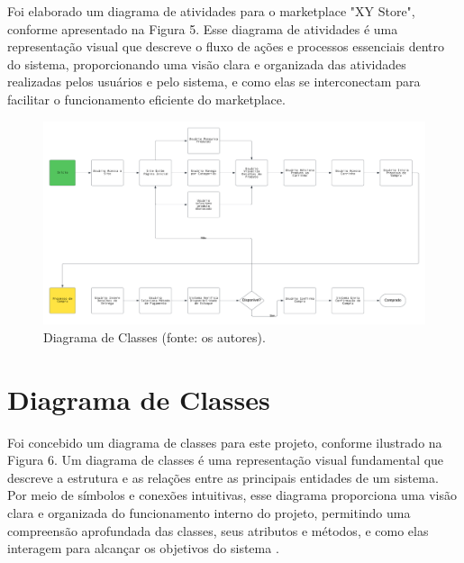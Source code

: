 \documentclass[
	12pt,				%
	openright,			%
	twoside,			%
	a4paper,			%
	english,			%
	brazil				%
	]{abntex2}
\begin{document}
Foi elaborado um diagrama de atividades para o marketplace "XY Store", conforme apresentado na Figura 5. Esse diagrama de atividades é uma representação visual que descreve o fluxo de ações e processos essenciais dentro do sistema, proporcionando uma visão clara e organizada das atividades realizadas pelos usuários e pelo sistema, e como elas se interconectam para facilitar o funcionamento eficiente do marketplace.

\begin{figure}[htb]
	\centering
	\includegraphics[width=1\textwidth]{img/diagrama-de-atividades}
	\caption{Diagrama de Classes (fonte: os autores).}
	\label{fig:diagrama-de-atividades}
\end{figure}


\section{Diagrama de Classes}

Foi concebido um diagrama de classes para este projeto, conforme ilustrado na Figura 6. Um diagrama de classes é uma representação visual fundamental que descreve a estrutura e as relações entre as principais entidades de um sistema. Por meio de símbolos e conexões intuitivas, esse diagrama proporciona uma visão clara e organizada do funcionamento interno do projeto, permitindo uma compreensão aprofundada das classes, seus atributos e métodos, e como elas interagem para alcançar os objetivos do sistema .
\end{document}
